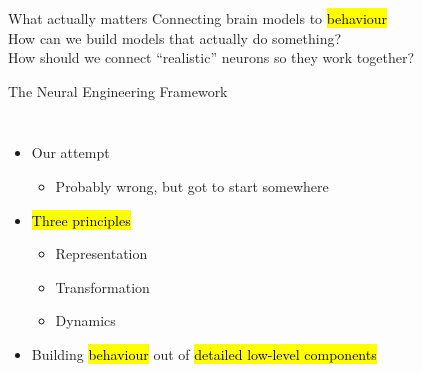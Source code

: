\documentclass[handout,aspectratio=169]{beamer}
\begin{document}
\begin{frame}{What actually matters\textellipsis}
	Connecting brain models to \hl{behaviour}\\[0.25cm]
	\pause
	How can we build models that actually do something?\\[0.25cm]
	\pause
	How should we connect \enquote{realistic} neurons so they work together?\\[0.25cm]
\end{frame}

\begin{frame}{The Neural Engineering Framework}
	\begin{columns}
		\begin{itemize}
			\setlength{\itemsep}{0.25cm}
			\item Our attempt\\[0.125cm]
			\begin{itemize}
				\item Probably wrong, but got to start somewhere
			\end{itemize}
			\item \hl{Three principles}\\[0.125cm]
			\begin{itemize}
				\setlength{\itemsep}{0.25cm}
				\item Representation
				\item Transformation
				\item Dynamics
			\end{itemize}
			\item Building \hl{behaviour} out of \hl{detailed low-level components}
		\end{itemize}

\end{columns}
\end{frame}
\end{document}
